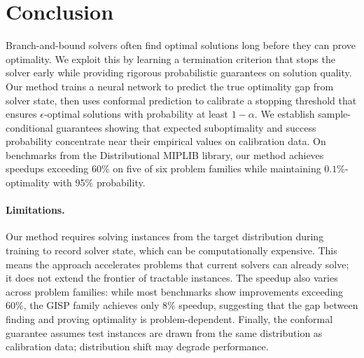 \documentclass[12pt]{article}
\theoremstyle{definition}
\theoremstyle{remark}
\newcommand{\tol}{\epsilon}
\newcommand{\errorprob}{\alpha}
\newcommand{\change}[1]{#1}
\newcommand{\tol}{\epsilon}
\newcommand{\errorprob}{\alpha}
\newcommand{\change}[1]{#1}
\theoremstyle{plain}
\theoremstyle{definition}
\theoremstyle{remark}
\begin{document}

\section{Conclusion}
Branch-and-bound solvers often find optimal solutions long before they can prove optimality.
We exploit this by learning a termination criterion that stops the solver early while providing rigorous probabilistic guarantees on solution quality.
Our method trains a neural network to predict the true optimality gap from solver state, then uses conformal prediction to calibrate a stopping threshold that ensures $\tol$-optimal solutions with probability at least $1 - \errorprob$.
We establish sample-conditional guarantees showing that expected suboptimality and success probability concentrate near their empirical values on calibration data.
On benchmarks from the Distributional MIPLIB library, our method achieves speedups exceeding 60\% on five of \change{six} problem families while maintaining $0.1\%$-optimality with 95\% probability.

\paragraph{Limitations.}
Our method requires solving instances from the target distribution during training to record solver state, which can be computationally expensive.
This means the approach accelerates problems that current solvers can already solve; it does not extend the frontier of tractable instances.
The speedup also varies across problem families: while most benchmarks show improvements exceeding 60\%, the GISP family achieves only 8\% speedup, suggesting that the gap between finding and proving optimality is problem-dependent.
Finally, the conformal guarantee assumes test instances are drawn from the same distribution as calibration data; distribution shift may degrade performance.


\end{document}
